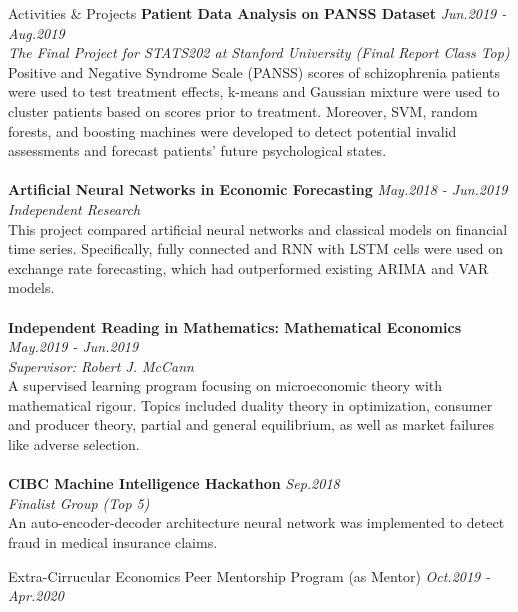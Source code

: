 \documentclass{resume} %
\begin{document}
\begin{rSection}{Activities \& Projects}
{\bf Patient Data Analysis on PANSS Dataset} \hfill \emph{Jun.2019 - Aug.2019}
\\ \emph{The Final Project for STATS202 at Stanford University (Final Report Class Top)}
\\ Positive and Negative Syndrome Scale (PANSS) scores of schizophrenia patients were used to test treatment effects, k-means and Gaussian mixture were used to cluster patients based on scores prior to treatment. Moreover, SVM, random forests, and boosting machines were developed to detect potential invalid assessments and forecast patients' future psychological states.
\\
\\{\bf Artificial Neural Networks in Economic Forecasting} \hfill \emph{May.2018 - Jun.2019}
\\ \emph{Independent Research}
\\ This project compared artificial neural networks and classical models on financial time series. Specifically, fully connected and RNN with LSTM cells were used on exchange rate forecasting, which had outperformed existing ARIMA and VAR models.
\\
\\{\bf Independent Reading in Mathematics: Mathematical Economics} \hfill \emph{May.2019 - Jun.2019}
\\ \emph{Supervisor: Robert J. McCann}
\\
A supervised learning program focusing on microeconomic theory with mathematical rigour. Topics included duality theory in optimization, consumer and producer theory, partial and general equilibrium, as well as market failures like adverse selection.
\\
\\{\bf CIBC Machine Intelligence Hackathon} \hfill \emph{Sep.2018}
\\ \emph{Finalist Group (Top 5)}
\\
An auto-encoder-decoder architecture neural network was implemented to detect fraud in medical insurance claims.
\\

\end{rSection}

\begin{rSection}{Extra-Cirrucular} 
	Economics Peer Mentorship Program (as Mentor) \hfill \emph{Oct.2019 - Apr.2020}
\end{rSection}
\end{document}
